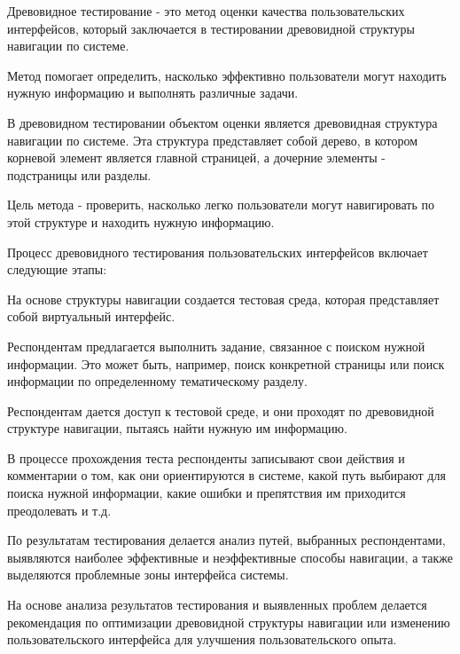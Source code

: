 Древовидное тестирование - это метод оценки качества пользовательских интерфейсов, который заключается в тестировании древовидной структуры навигации по системе.

Метод помогает определить, насколько эффективно пользователи могут находить нужную информацию и выполнять различные задачи.

В древовидном тестировании объектом оценки является древовидная структура навигации по системе. Эта структура представляет собой дерево, в котором корневой элемент является главной страницей, а дочерние элементы - подстраницы или разделы. 

Цель метода - проверить, насколько легко пользователи могут навигировать по этой структуре и находить нужную информацию.

Процесс древовидного тестирования пользовательских интерфейсов включает следующие этапы:
\begin{textitemize}
	\item На основе структуры навигации создается тестовая среда, которая представляет собой виртуальный интерфейс.
	
	\item Респондентам предлагается выполнить задание, связанное с поиском нужной информации. Это может быть, например, поиск конкретной страницы или поиск информации по определенному тематическому разделу.
	
	\item Респондентам дается доступ к тестовой среде, и они проходят по древовидной структуре навигации, пытаясь найти нужную им информацию.
	
	\item В процессе прохождения теста респонденты записывают свои действия и комментарии о том, как они ориентируются в системе, какой путь выбирают для поиска нужной информации, какие ошибки и препятствия им приходится преодолевать и т.д.
	
	\item По результатам тестирования делается анализ путей, выбранных респондентами, выявляются наиболее эффективные и неэффективные способы навигации, а также выделяются проблемные зоны интерфейса системы.
	
	\item На основе анализа результатов тестирования и выявленных проблем делается рекомендация по оптимизации древовидной структуры навигации или изменению пользовательского интерфейса для улучшения пользовательского опыта.
\end{textitemize}

